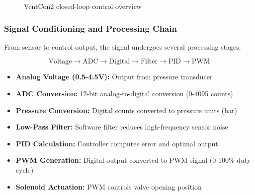 \documentclass[12pt,a4paper]{article}
\begin{document}
\begin{figure}[H]
\centering
{}
\caption{VentCon2 closed-loop control overview}
\label{fig:system-overall}
\end{figure}

\subsubsection{Signal Conditioning and Processing Chain}

From sensor to control output, the signal undergoes several processing stages:

    \begin{equation}
    \text{Voltage} \rightarrow \text{ADC} \rightarrow \text{Digital} \rightarrow \text{Filter} \rightarrow \text{PID} \rightarrow \text{PWM}
    \end{equation}

    \begin{itemize}
        \item \textbf{Analog Voltage (0.5-4.5V):} Output from pressure transducer
        \item \textbf{ADC Conversion:} 12-bit analog-to-digital conversion (0-4095 counts)
        \item \textbf{Pressure Conversion:} Digital counts converted to pressure units (bar)
        \item \textbf{Low-Pass Filter:} Software filter reduces high-frequency sensor noise
        \item \textbf{PID Calculation:} Controller computes error and optimal output
        \item \textbf{PWM Generation:} Digital output converted to PWM signal (0-100\% duty cycle)
        \item \textbf{Solenoid Actuation:} PWM controls valve opening position
    \end{itemize}
\end{document}
